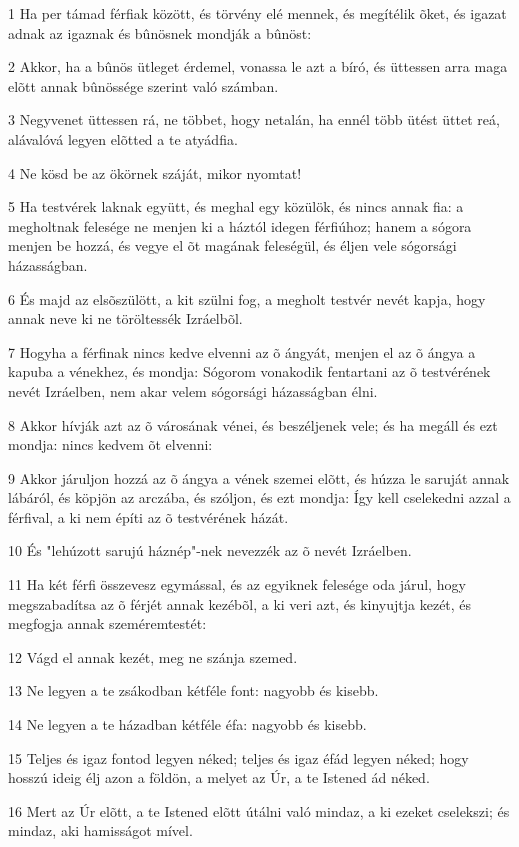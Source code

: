 \par 1 Ha per támad férfiak között, és törvény elé mennek, és megítélik õket, és igazat adnak az igaznak és bûnösnek mondják a bûnöst:
\par 2 Akkor, ha a bûnös ütleget érdemel, vonassa le azt a bíró, és üttessen arra maga elõtt annak bûnössége szerint való számban.
\par 3 Negyvenet üttessen rá, ne többet, hogy netalán, ha ennél több ütést üttet reá, alávalóvá legyen elõtted a te atyádfia.
\par 4 Ne kösd be az ökörnek száját, mikor nyomtat!
\par 5 Ha testvérek laknak együtt, és meghal egy közülök, és nincs annak fia: a megholtnak felesége ne menjen ki a háztól idegen férfiúhoz; hanem a sógora menjen be hozzá, és vegye el õt magának feleségül, és éljen vele sógorsági házasságban.
\par 6 És majd az elsõszülött, a kit szülni fog, a megholt testvér nevét kapja, hogy annak neve ki ne töröltessék Izráelbõl.
\par 7 Hogyha a férfinak nincs kedve elvenni az õ ángyát, menjen el az õ ángya a kapuba a vénekhez, és mondja: Sógorom vonakodik fentartani az õ testvérének nevét Izráelben, nem akar velem sógorsági házasságban élni.
\par 8 Akkor hívják azt az õ városának vénei, és beszéljenek vele; és ha megáll és ezt mondja: nincs kedvem õt elvenni:
\par 9 Akkor járuljon hozzá az õ ángya a vének szemei elõtt, és húzza le saruját annak lábáról, és köpjön az arczába, és szóljon, és ezt mondja: Így kell cselekedni azzal a férfival, a ki nem építi az õ testvérének házát.
\par 10 És "lehúzott sarujú háznép"-nek nevezzék az õ nevét Izráelben.
\par 11 Ha két férfi összevesz egymással, és az egyiknek felesége oda járul, hogy megszabadítsa az õ férjét annak kezébõl, a ki veri azt, és kinyujtja kezét, és megfogja annak szeméremtestét:
\par 12 Vágd el annak kezét, meg ne szánja szemed.
\par 13 Ne legyen a te zsákodban kétféle font: nagyobb és kisebb.
\par 14 Ne legyen a te házadban kétféle éfa: nagyobb és kisebb.
\par 15 Teljes és igaz fontod legyen néked; teljes és igaz éfád legyen néked; hogy hosszú ideig élj azon a földön, a melyet az Úr, a te Istened ád néked.
\par 16 Mert az Úr elõtt, a te Istened elõtt útálni való mindaz, a ki ezeket cselekszi; és mindaz, aki hamisságot mível.
